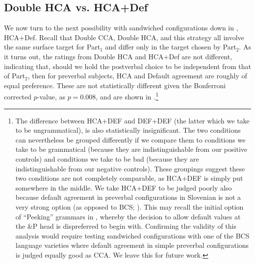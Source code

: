 \documentclass[output=paper
,modfonts
,nonflat]{langsci/langscibook}
\begin{document}
\subsection{Double HCA vs. HCA+Def}\largerpage
We now turn to the next possibility with sandwiched configurations down in , HCA+Def. Recall that Double CCA, Double HCA, and this strategy all involve the same surface target for Part$_1$ and differ only in the target chosen by Part$_2$. As it turns out, the ratings from Double HCA and HCA+Def are not different, indicating that, should we hold the postverbal choice to be independent from that of Part$_2$, then for preverbal subjects, HCA and Default agreement are roughly of equal preference. These are not statistically different given the Bonferroni corrected $p$-value, as $p = 0.008$, and are shown in .\footnote{The difference between HCA+DEF and DEF+DEF (the latter which we take to be ungrammatical), is also statistically insignificant. The two conditions can nevertheless be grouped differently if we compare them to conditions  we take to be grammatical (because they are indistinguishable from our positive controls) and conditions we take to be bad (because they are indistinguishable from our negative controls). These groupings suggest these two conditions are not completely comparable, as HCA+DEF is simply put somewhere in the middle. We take HCA+DEF to be judged poorly also because default agreement in preverbal configurations in Slovenian is not a very strong option (as opposed to BCS; \citealt{willergold:16}). This may recall the initial option of ``Peeking'' grammars in \cite{marusicnevinsbadecker:15}, whereby the decision to allow default values at the \&P head is dispreferred to begin with. Confirming the validity of this analysis would require testing sandwiched configurations with one of the BCS language varieties where default agreement in simple preverbal configurations is judged equally good as CCA. We leave this for future work.}

\end{document}
